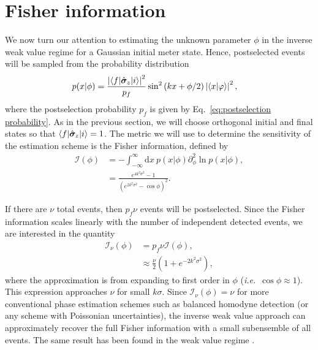 \section{Fisher information}\label{sec:noiseless}
We now turn our attention to estimating the unknown parameter $\phi$ in the inverse weak value regime for a Gaussian initial meter state.  Hence, postselected events will be sampled from the probability distribution
\begin{align}\label{eq: general distribution}
	p(x|\phi) &= \frac{\left|\langle f \rvert\hat{\bm \sigma}_z \lvert i\rangle\right|^2}{p_f}\sin^2\left(kx + \phi/2\right)\left|\langle x \vert \varphi \rangle\right|^2,
\end{align}  
where the postselection probability $p_f$ is given by Eq.~\eqref{eq:postselection probability}.
As in the previous section, we will choose orthogonal initial and final states so that $\langle f \rvert\hat{\bm \sigma}_z\lvert i\rangle = 1$.
The metric we will use to determine the sensitivity of the estimation scheme is the Fisher information, defined by 
\begin{align}\label{eq:noiseless fisher}
	\nonumber \mathcal{I}(\phi) &= -\int_{-\infty}^{\infty} \text{d}x~ p(x|\phi)\partial_\phi^2 \ln p(x|\phi), \\
	&= \frac{e^{4k^2\sigma^2} - 1}{(e^{2k^2\sigma^2}-\cos \phi)^2}.
\end{align}

If there are $\nu$ total events, then $p_f \nu$ events will be postselected.  Since the Fisher information scales linearly with the number of independent detected events, we are interested in the quantity
\begin{align}
	\mathcal{I}_\nu (\phi) &= p_f \nu \mathcal{I}(\phi), \nonumber \\
	&\approx  \frac{\nu}{2}\left(1 + e^{-2k^2\sigma^2}\right),
\end{align} 
where the approximation is from expanding to first order in $\phi$ (\emph{i.e.}~$\cos \phi \approx 1$). This expression approaches $\nu$ for small $k\sigma$.  Since $\mathcal{I}_\nu(\phi) = \nu$ for more conventional phase estimation schemes such as balanced homodyne detection (or any scheme with Poissonian uncertainties), the inverse weak value approach can approximately recover the full Fisher information with a small subensemble of all events.  The same result has been found in the weak value regime \cite{Jordan2014}.

